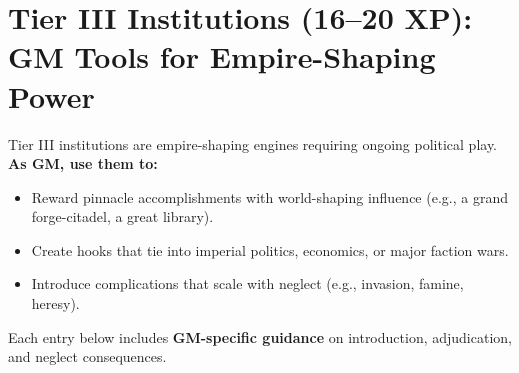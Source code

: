 \section{Tier III Institutions (16--20 XP): GM Tools for Empire-Shaping Power}
\label{sec:tier-iii-assets}
Tier III institutions are empire-shaping engines requiring ongoing political play. \textbf{As GM, use them to:}  
\begin{itemize}
  \item Reward pinnacle accomplishments with world-shaping influence (e.g., a grand forge-citadel, a great library).  
  \item Create hooks that tie into imperial politics, economics, or major faction wars.  
  \item Introduce complications that scale with neglect (e.g., invasion, famine, heresy).  
\end{itemize}
Each entry below includes \textbf{GM-specific guidance} on introduction, adjudication, and neglect consequences.

